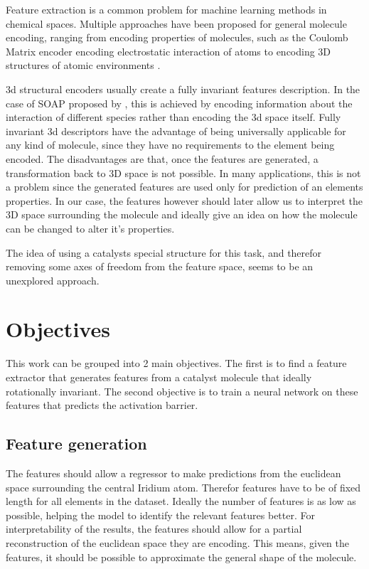 Feature extraction is a common problem for machine learning methods in chemical spaces.
Multiple approaches have been proposed for general molecule encoding, 
ranging from encoding properties of molecules, such as the Coulomb Matrix encoder encoding electrostatic interaction of atoms \cite{PhysRevLett.108.058301}
to encoding 3D structures of atomic environments \cite{Bart_k_2013}.

3d structural encoders usually create a fully invariant features description.
In the case of SOAP proposed by \citeauthor{Bart_k_2013}, this is achieved by encoding information about the interaction of 
different species rather than encoding the 3d space itself.
Fully invariant 3d descriptors have the advantage of being universally applicable for any kind of molecule, since they have no requirements to the element being encoded.
The disadvantages are that, once the features are generated, a transformation back to 3D space is not possible.
In many applications, this is not a problem since the generated features are used only for prediction of an elements properties.
In our case, the features however should later allow us to interpret the 3D space surrounding the molecule and ideally give an idea on how the molecule can be changed to alter it's properties.

The idea of using a catalysts special structure for this task, and therefor removing some axes of freedom from the feature space, seems to be an unexplored approach.


\section{Objectives}

This work can be grouped into 2 main objectives. 
The first is to find a feature extractor that generates features from a catalyst molecule that ideally rotationally invariant.
The second objective is to train a neural network on these features that predicts the activation barrier.

\subsection{Feature generation}

The features should allow a regressor to make predictions from the euclidean space surrounding the central Iridium atom.
Therefor features have to be of fixed length for all elements in the dataset.
Ideally the number of features is as low as possible, helping the model to identify the relevant features better.
For interpretability of the results, the features should allow for a partial reconstruction of the euclidean space they are encoding.
This means, given the features, it should be possible to approximate the general shape of the molecule.

